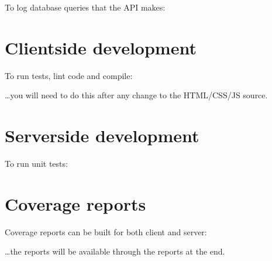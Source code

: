 \documentclass[letterpaper,10pt,english]{sphinxmanual}
\begin{document}
\sphinxAtStartPar
To log database queries that the API makes:

\begin{sphinxVerbatim}[commandchars=\\\{\}]
  
    
\end{sphinxVerbatim}


\section{Client\sphinxhyphen{}side development}
\label{\detokenize{advanced/development:client-side-development}}
\sphinxAtStartPar
To run tests, lint code and compile:

\begin{sphinxVerbatim}[commandchars=\\\{\}]
  
\end{sphinxVerbatim}

\sphinxAtStartPar
…you will need to do this after any change to the HTML/CSS/JS source.


\section{Server\sphinxhyphen{}side development}
\label{\detokenize{advanced/development:server-side-development}}
\sphinxAtStartPar
To run unit tests:

\begin{sphinxVerbatim}[commandchars=\\\{\}]
   
\end{sphinxVerbatim}


\section{Coverage reports}
\label{\detokenize{advanced/development:coverage-reports}}
\sphinxAtStartPar
Coverage reports can be built for both client and server:

\begin{sphinxVerbatim}[commandchars=\\\{\}]
 
\end{sphinxVerbatim}

\sphinxAtStartPar
…the reports will be available through the reports at the end.
\end{document}
